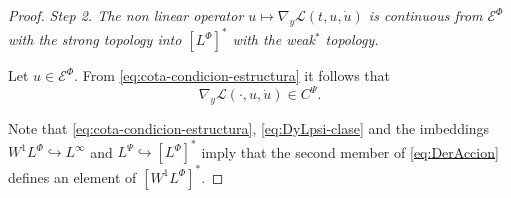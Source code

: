 \documentclass[twoside]{article}
\theoremstyle{remark}
\newcommand{\lphi}{L^{\Phi}}
\newcommand{\lpsi}{L^{\Psi}}
\newcommand{\wphi}{W^{1}\lphi}
\newcommand{\domi}{\mathcal{E}^{\Phi}}
\renewcommand{\leq}{\leqslant}
\begin{document}
\begin{proof}
\noindent\emph{Step 2. The non linear operator   $u
 \mapsto  \nabla_y\mathcal{L}(t,u,\dot{u})$ is continuous from $\domi$ with the strong topology  
into $\left[\lphi\right]^*$  with the weak$^*$ topology.}

 Let $u\in \domi$.  From  \eqref{eq:cota-condicion-estructura} it follows that 
\begin{equation}\label{eq:DyLpsi-clase}
\nabla_y\mathcal{L}(\cdot,u,\dot{u})\in C^{\Psi}.
\end{equation}

Note that \eqref{eq:cota-condicion-estructura},  \eqref{eq:DyLpsi-clase} and the imbeddings $\wphi \hookrightarrow L^{\infty}$ and  
$\lpsi\hookrightarrow  \left[\lphi\right]^*$ imply that the second member of
\eqref{eq:DerAccion} defines an element of $\left[\wphi\right]^*$.




\end{proof}
\end{document}
